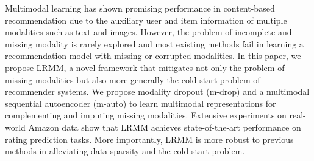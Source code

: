 Multimodal learning has shown promising performance in content-based recommendation due to the auxiliary user and item information of multiple modalities such as text and images.  However, the problem of incomplete and missing modality is rarely explored and most existing methods fail in learning a recommendation model with missing or corrupted modalities. In this paper, we propose LRMM, a novel framework that mitigates not only the problem of missing modalities but also more generally the cold-start problem of recommender systems. We propose modality dropout (m-drop) and a multimodal sequential autoencoder (m-auto) to learn multimodal representations for complementing and imputing missing modalities. Extensive experiments on real-world Amazon data show that LRMM achieves state-of-the-art performance on rating prediction tasks. More importantly, LRMM is more robust to previous methods in alleviating data-sparsity and the cold-start problem.
